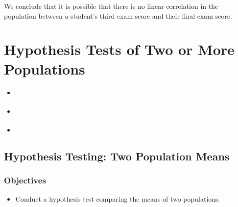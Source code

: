 \documentclass[letterpaper,10pt,english]{jupyterBook}
\begin{document}
\sphinxAtStartPar
We conclude that it is possible that there is no linear correlation in the population between a student’s third exam score and their final exam score.

\sphinxstepscope


\chapter{Hypothesis Tests of Two or More Populations}
\label{\detokenize{Ch9 Hypothesis Tests of Two or More Populations/9.0 Hypothesis Tests of Two or More Populations:hypothesis-tests-of-two-or-more-populations}}\label{\detokenize{Ch9 Hypothesis Tests of Two or More Populations/9.0 Hypothesis Tests of Two or More Populations::doc}}\begin{itemize}
\item {} 
\sphinxAtStartPar
{\hyperref[\detokenize{Ch9 Hypothesis Tests of Two or More Populations/9.1 Hypothesis Testing Two Population Means::doc}]{}}

\item {} 
\sphinxAtStartPar
{\hyperref[\detokenize{Ch9 Hypothesis Tests of Two or More Populations/9.2 Hypothesis Testing Two Population Variances::doc}]{}}

\item {} 
\sphinxAtStartPar
{\hyperref[\detokenize{Ch9 Hypothesis Tests of Two or More Populations/9.3 ANOVA::doc}]{}}

\end{itemize}

\sphinxstepscope


\section{Hypothesis Testing: Two Population Means}
\label{\detokenize{Ch9 Hypothesis Tests of Two or More Populations/9.1 Hypothesis Testing Two Population Means:hypothesis-testing-two-population-means}}\label{\detokenize{Ch9 Hypothesis Tests of Two or More Populations/9.1 Hypothesis Testing Two Population Means::doc}}

\subsection{Objectives}
\label{\detokenize{Ch9 Hypothesis Tests of Two or More Populations/9.1 Hypothesis Testing Two Population Means:objectives}}\begin{itemize}
\item {} 
\sphinxAtStartPar
Conduct a hypothesis test comparing the means of two populations.

\end{itemize}
\end{document}
